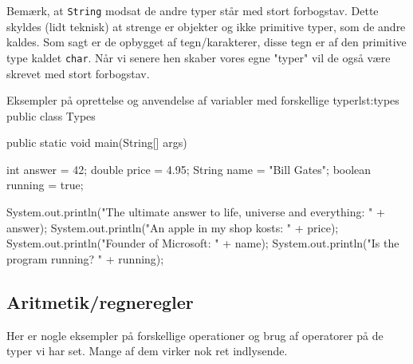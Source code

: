 \begin{remark}
	Bemærk, at \texttt{String} modsat de andre typer står med stort forbogstav. Dette skyldes (lidt teknisk) at strenge er objekter og ikke primitive typer, som de andre kaldes. Som sagt er de opbygget af tegn/karakterer, disse tegn er af den primitive type kaldet \texttt{char}. Når vi senere hen skaber vores egne "typer" vil de også være skrevet med stort forbogstav.
\end{remark}

\begin{JavaCode}{Eksempler på oprettelse og anvendelse af variabler med forskellige typer}{lst:types}
	public class Types {
		public static void main(String[] args) {
			int answer = 42;
			double price = 4.95;
			String name = "Bill Gates";
			boolean running = true;
			
			System.out.println("The ultimate answer to life, universe and everything: " + answer);
			System.out.println("An apple in my shop kosts: " + price);
			System.out.println("Founder of Microsoft: " + name);
			System.out.println("Is the program running? " + running);
		}
	}
\end{JavaCode}

\subsection{Aritmetik/regneregler}
Her er nogle eksempler på forskellige operationer og brug af operatorer på de typer vi har set. Mange af dem virker nok ret indlysende.

